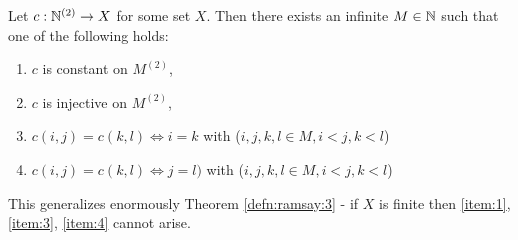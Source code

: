\begin{thm}
  \label{defn:ramsay:6}
  Let $c: \mathbb{N}^{(2)} \rightarrow X$ for some set $X$.  Then there exists
  an infinite $M \in \mathbb{N}$ such that one of the following holds:
  \begin{enumerate}
  \item \label{item:1}$c$ is constant on $M^{(2)}$,
  \item \label{item:2}$c$ is injective on $M^{(2)}$,
  \item \label{item:3}$c(i, j) = c(k, l) \iff i = k$ with ($i, j, k, l \in M, i < j, k < l$)
  \item \label{item:4}$c(i, j) = c(k, l) \iff j = l)$ with ($i, j, k, l \in M, i < j, k < l$)
  \end{enumerate}
\end{thm}

\begin{remark}
  This generalizes enormously Theorem \ref{defn:ramsay:3} - if $X$ is
  finite then \ref{item:1}, \ref{item:3}, \ref{item:4} cannot arise.
\end{remark}

